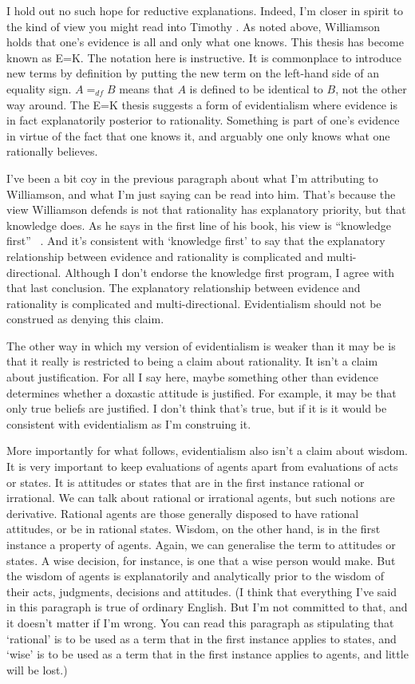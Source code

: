 I hold out no such hope for reductive explanations. Indeed, I'm closer in spirit to the kind of view you might read into Timothy  \citet{Williamson2000}. As noted above, Williamson holds that one's evidence is all and only what one knows. This thesis has become known as E=K. The notation here is instructive. It is commonplace to introduce new terms by definition by putting the new term on the left-hand side of an equality sign. $A =_{df} B$ means that $A$ is defined to be identical to $B$, not the other way around. The E=K thesis suggests a form of evidentialism where evidence is in fact explanatorily posterior to rationality. Something is part of one's evidence in virtue of the fact that one knows it, and arguably one only knows what one rationally believes.

I've been a bit coy in the previous paragraph about what I'm attributing to Williamson, and what I'm just saying can be read into him. That's because the view Williamson defends is not that rationality has explanatory priority, but that knowledge does. As he says in the first line of his book, his view is ``knowledge first'' ~\citep[v]{Williamson2000}. And it's consistent with `knowledge first' to say that the explanatory relationship between evidence and rationality is complicated and multi-directional. Although I don't endorse the knowledge first program, I agree with that last conclusion. The explanatory relationship between evidence and rationality is complicated and multi-directional. Evidentialism should not be construed as denying this claim.

The other way in which my version of evidentialism is weaker than it may be is that it really is restricted to being a claim about rationality. It isn't a claim about justification. For all I say here, maybe something other than evidence determines whether a doxastic attitude is justified. For example, it may be that only true beliefs are justified. I don't think that's true, but if it is it would be consistent with evidentialism as I'm construing it. 

More importantly for what follows, evidentialism also isn't a claim about wisdom. It is very important to keep evaluations of agents apart from evaluations of acts or states. It is attitudes or states that are in the first instance rational or irrational. We can talk about rational or irrational agents, but such notions are derivative. Rational agents are those generally disposed to have rational attitudes, or be in rational states. Wisdom, on the other hand, is in the first instance a property of agents. Again, we can generalise the term to attitudes or states. A wise decision, for instance, is one that a wise person would make. But the wisdom of agents is explanatorily and analytically prior to the wisdom of their acts, judgments, decisions and attitudes. (I think that everything I've said in this paragraph is true of ordinary English. But I'm not committed to that, and it doesn't matter if I'm wrong. You can read this paragraph as stipulating that `rational' is to be used as a term that in the first instance applies to states, and `wise' is to be used as a term that in the first instance applies to agents, and little will be lost.)


